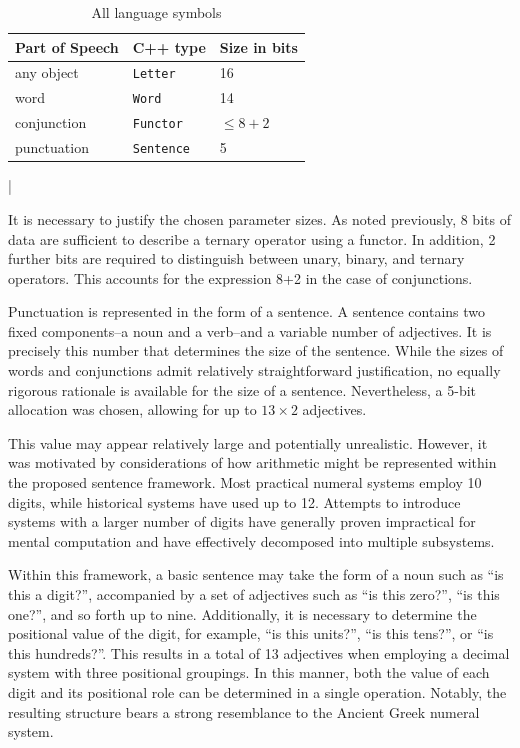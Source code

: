 \documentclass[12pt, a4paper]{article}
\begin{document}
\begin{table}
\begin{center}
\begin{tabular}{ | l | l | l | } 
 \toprule
 Part of Speech  & C++ type             & Size in bits      \\ 
 \midrule
 any object      & \lstinline!Letter!   & 16                \\ 
 word            & \lstinline!Word!     & 14                \\ 
 conjunction     & \lstinline!Functor!  & $\leqslant 8+2$   \\ 
 punctuation     & \lstinline!Sentence! & 5                 \\ 
 \bottomrule
\end{tabular}
\end{center}
\caption{All language symbols}
\label{tab:symbols} 
\end{table}

\lstMakeShortInline|

It is necessary to justify the chosen parameter sizes. As noted previously, 8 bits of data 
are sufficient to describe a ternary operator using a functor. In addition, 2 further 
bits are required to distinguish between unary, binary, and ternary operators. This 
accounts for the expression 8+2 in the case of conjunctions.

Punctuation is represented in the form of a sentence. A sentence contains two fixed 
components--a noun and a verb--and a variable number of adjectives. It is precisely this 
number that determines the size of the sentence. While the sizes of words and conjunctions 
admit relatively straightforward justification, no equally rigorous rationale is available 
for the size of a sentence. Nevertheless, a 5-bit allocation was chosen, allowing for up 
to $13 \times 2$ adjectives.

This value may appear relatively large and potentially unrealistic. However, it was motivated 
by considerations of how arithmetic might be represented within the proposed sentence 
framework. Most practical numeral systems employ 10 digits, while historical systems have 
used up to 12. Attempts to introduce systems with a larger number of digits have generally 
proven impractical for mental computation and have effectively decomposed into multiple subsystems.

Within this framework, a basic sentence may take the form of a noun such as ``is this a 
digit?'', accompanied by a set of adjectives such as ``is this zero?'', ``is this one?'', 
and so forth up to nine. Additionally, it is necessary to determine the positional 
value of the digit, for example, ``is this units?'', ``is this tens?'', or ``is this hundreds?''. 
This results in a total of 13 adjectives when employing a decimal system with three positional 
groupings. In this manner, both the value of each digit and its positional role can be 
determined in a single operation. Notably, the resulting structure bears a strong 
resemblance to the Ancient Greek numeral system\cite{Greek_numerals}.
\end{document}
